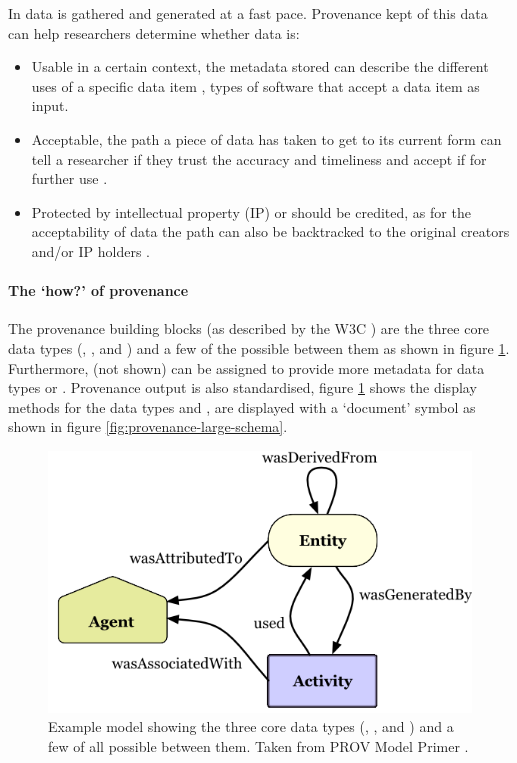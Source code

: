 In \escience{} data is gathered and generated at a fast pace.
Provenance kept of this data can help researchers determine whether data is:

\begin{itemize}
	\item Usable in a certain context, the metadata stored can describe the different uses of a specific data item \cite{dsp1simmhan}, \eg{} types of software that accept a data item as input.
	\item Acceptable, the path a piece of data has taken to get to its current form can tell a researcher if they trust the accuracy and timeliness and accept if for further use \cite{dsp1simmhan,dsp3buneman}.
	\item Protected by intellectual property (IP) or should be credited, as for the acceptability of data the path can also be backtracked to the original creators and/or IP holders \cite{dsp1simmhan}.
\end{itemize}

\paragraph{The `how?' of provenance}
\label{provenance-how}

The provenance building blocks (as described by the W3C \cite{dsp8gil}) are the three core data types (\agent{}, \entity{}, and \activity{}) and a few of the possible \relations{} between them as shown in figure \ref{fig:provenance-overview}.
Furthermore, \attributes{} (not shown) can be assigned to provide more metadata for data types or \relations{}.
Provenance output is also standardised, figure \ref{fig:provenance-overview} shows the display methods for the data types and \relations{}, \attributes{} are displayed with a `document' symbol as shown in figure \ref{fig:provenance-large-schema}.

\begin{figure}[!tbhp]
	\centering
	\includegraphics[width=0.5\linewidth]{images/provenance-overview}
	\caption{Example model showing the three core data types (\agent{}, \entity{}, and \activity{}) and a few of all possible \relations{} between them. 
		Taken from PROV Model Primer \cite{dsp8gil}.}
	\label{fig:provenance-overview}
\end{figure}

